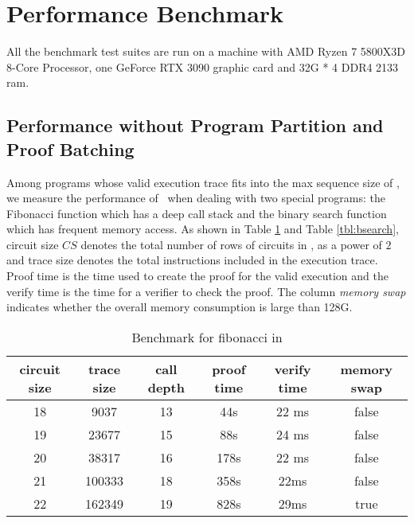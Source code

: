 \section{Performance Benchmark}
\label{chp:performance}
All the benchmark test suites are run on a machine with AMD Ryzen 7 5800X3D 8-Core Processor, one GeForce RTX 3090 graphic card and 32G * 4 DDR4 2133 ram.

\subsection{Performance without Program Partition and Proof Batching}
Among programs whose valid execution trace fits into the max sequence size of \zkwasm, we measure the performance of \zkwasm\, when dealing with two special programs: the Fibonacci function which has a deep call stack and the binary search function which has frequent memory access. As shown in Table \ref{tbl:fib} and Table \ref{tbl:bsearch}, circuit size $CS$ denotes the total number of rows of circuits in \zkwasm, as a power of $2$ and trace size denotes the total instructions included in the execution trace. Proof time is the time \zkwasm used to create the proof for the valid execution and the verify time is the time for a verifier to check the proof. The column \emph{memory swap} indicates whether the overall memory consumption is large than 128G.
\begin{table}[!h]
\small
\begin{center}
\caption{Benchmark for fibonacci in \zkwasm}
\label{tbl:fib}
\begin{tabular}{ | c | c | c | c | c| c| }
  \hline
  circuit size & trace size & call depth & proof time & verify time & memory swap\\ 
  \hline
  18 & 9037 & 13 & 44s & 22 ms & false\\
  \hline
    19 & 23677 & 15 & 88s & 24 ms & false \\
  \hline
    20 & 38317 & 16 & 178s & 22 ms & false \\
  \hline
    21 & 100333 & 18 & 358s & 22ms & false\\
  \hline
    22 & 162349 & 19 & 828s & 29ms & true \\
  \hline
\end{tabular}

\end{center}
\end{table}

